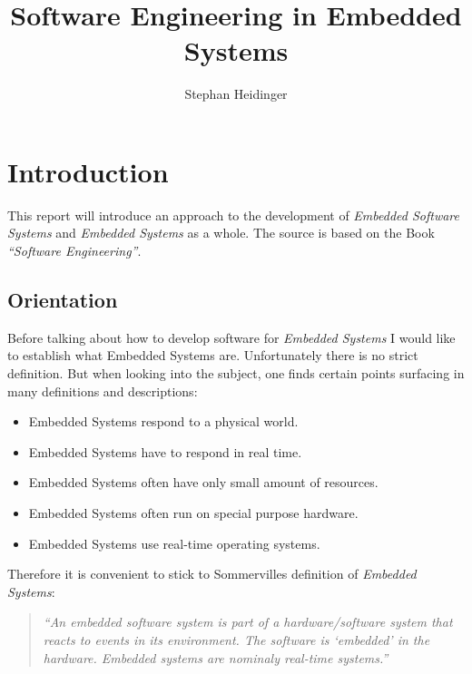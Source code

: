 \documentclass[10pt,a4paper,titlepage,draft]{article} %
\author{Stephan Heidinger}
\title{Software Engineering in Embedded Systems}
\begin{document}
\maketitle

\pagestyle{empty}
\tableofcontents
\newpage
\pagestyle{plain}
\setcounter{page}{1} %


\section{Introduction}

This report will introduce an approach to the development of \emph{Embedded Software Systems} and \emph{Embedded Systems} as a whole. The source is based on the Book \textit{``Software Engineering''}\cite[chapter 20]{sommerville}.

\subsection{Orientation}
Before talking about how to develop software for \emph{Embedded Systems} I would like to establish what Embedded Systems are.
Unfortunately there is no strict definition.
But when looking into the subject, one finds certain points surfacing in many definitions and descriptions:
\begin{itemize}
	\item Embedded Systems respond to a physical world.
	\item Embedded Systems have to respond in real time.
	\item Embedded Systems often have only small amount of resources.
	\item Embedded Systems often run on special purpose hardware.
	\item Embedded Systems use real-time operating systems.
\end{itemize}
Therefore it is convenient to stick to Sommervilles definition of \emph{Embedded Systems}:
\begin{quote}
\textit{``An \emph{embedded software system} is part of a hardware/software system that reacts to events in its environment.
The software is ‘embedded’ in the hardware.
Embedded systems are nominaly real-time systems.'' \cite[p. 561]{sommerville} }
\end{quote}
\end{document}
